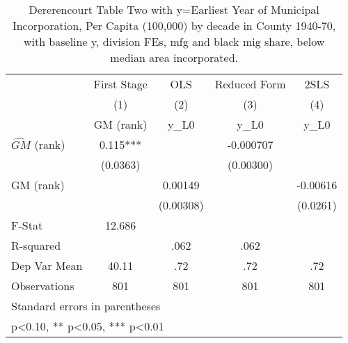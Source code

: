 \begin{table}[htbp]\centering
\def\sym#1{\ifmmode^{#1}\else\(^{#1}\)\fi}
\caption{Dererencourt Table Two with y=Earliest Year of Municipal Incorporation, Per Capita (100,000) by decade in County 1940-70, with baseline y, division FEs, mfg and black mig share, below median area incorporated.}
\begin{tabular}{l*{4}{c}}
\toprule
                    & First Stage   &         OLS   &Reduced Form   &        2SLS   \\
                    &\multicolumn{1}{c}{(1)}&\multicolumn{1}{c}{(2)}&\multicolumn{1}{c}{(3)}&\multicolumn{1}{c}{(4)}\\
                    &\multicolumn{1}{c}{GM  (rank)}&\multicolumn{1}{c}{y\_L0}&\multicolumn{1}{c}{y\_L0}&\multicolumn{1}{c}{y\_L0}\\
\midrule
$\hat{GM}$ (rank)   &       0.115***&               &   -0.000707   &               \\
                    &    (0.0363)   &               &   (0.00300)   &               \\
\addlinespace
GM  (rank)          &               &     0.00149   &               &    -0.00616   \\
                    &               &   (0.00308)   &               &    (0.0261)   \\
\midrule
F-Stat              &      12.686   &               &               &               \\
R-squared           &               &        .062   &        .062   &               \\
Dep Var Mean        &       40.11   &         .72   &         .72   &         .72   \\
Observations        &         801   &         801   &         801   &         801   \\
\bottomrule
\multicolumn{5}{l}{\footnotesize Standard errors in parentheses}\\
\multicolumn{5}{l}{\footnotesize * p<0.10, ** p<0.05, *** p<0.01}\\
\end{tabular}
\end{table}
